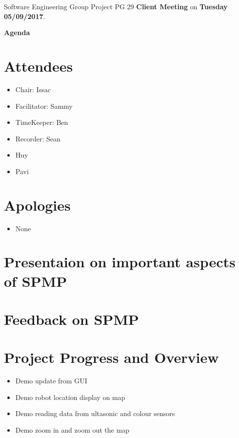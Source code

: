 \documentclass[11pt, a4paper]{article}
\begin{document}
\noindent Software Engineering Group Project PG 29 {\bf Client Meeting} on {\bf Tuesday 05/09/2017}.
\vspace*{10pt}
\begin{center}
\huge \bf Agenda
\end{center}

\section{Attendees}
\begin{itemize}
\item Chair: Issac
\item Facilitator: Sammy
\item TimeKeeper: Ben 
\item Recorder: Sean
\item Huy
\item Pavi
\end{itemize}

\section{Apologies}
\begin{itemize}
\item None
\end{itemize}

\section{Presentaion on important aspects of SPMP}

\section{Feedback on SPMP} 

\section{Project Progress and Overview}
\begin{itemize}
	\item Demo update from GUI 
	\item Demo robot location display on map
	\item Demo reading data from ultasonic and colour sensors
	\item Demo zoom in and zoom out the map 
\end{itemize}
\end{document}
